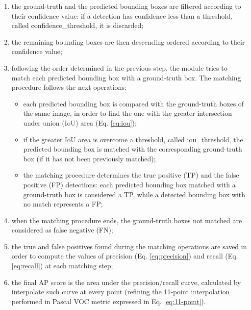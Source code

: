 \begin{enumerate}
	\item the  ground-truth and the predicted bounding boxes are filtered according to their confidence value: if a detection has confidence less than a threshold, called \textsf{confidence\_threshold}, it is discarded;
	\item the remaining bounding boxes are then descending ordered according to their confidence value;
	\item  following the order determined in the previous step, the module tries to match each predicted bounding box with a  ground-truth box. The matching procedure follows the next operations:
	\begin{itemize}
		\item each predicted bounding box is compared with the  ground-truth boxes of the same image, in order to find the one with the greater intersection under union (IoU) area (Eq. \ref{eq:iou});
		\item if the greater IoU area is overcome a threshold, called \textsf{iou\_threshold}, the predicted bounding box is matched with the corresponding  ground-truth box (if it has not been previously matched);
		\item the matching procedure determines the true positive (TP) and the false positive (FP) detections: each predicted bounding box matched with a  ground-truth box is considered a TP, while a detected bounding box with no match represents a FP;
	\end{itemize}
	\item when the matching procedure ends, the  ground-truth boxes not matched  are considered as false negative (FN);
	\item the true and false positives found during the matching operations are saved in order to compute the values of precision (Eq. \ref{eq:precision}) and recall (Eq. \ref{eq:recall}) at each matching step; 
	\item the final AP score is the area under the precision/recall curve, calculated by interpolate such curve at every point (refining the 11-point interpolation performed in Pascal VOC metric expressed in Eq. \ref{eq:11-point}).
\end{enumerate} 

